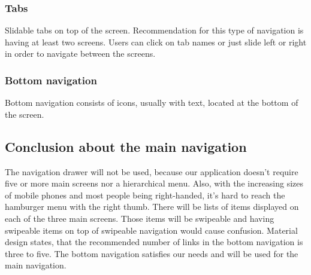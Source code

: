\subsubsection{Tabs}
Slidable tabs on top of the screen.
Recommendation for this type of navigation is having at least two screens.\cite{materialandroid}
Users can click on tab names or just slide left or right in order to navigate between the screens.

\subsubsection{Bottom navigation}
Bottom navigation consists of icons, usually with text, located at the bottom of the screen.

\subsection{Conclusion about the main navigation}
The navigation drawer will not be used, because our application doesn't require five or more main screens nor a hierarchical menu.
Also, with the increasing sizes of mobile phones and most people being right-handed, it's hard to reach the hamburger menu with the right thumb.
There will be lists of items displayed on each of the three main screens.
Those items will be swipeable and having swipeable items on top of swipeable navigation would cause confusion.
Material design states, that the recommended number of links in the bottom navigation is three to five.\cite{materialandroid}
The bottom navigation satisfies our needs and will be used for the main navigation.

